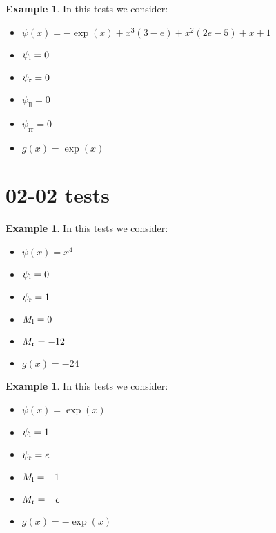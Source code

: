\documentclass[11pt,a4paper]{article}
\theoremstyle{plain}
\theoremstyle{definition}
\newtheorem{exmp}[thm]{Example} %
\begin{document}
\begin{exmp}
\label{Example:PRO:bending:01_01_glob2}
In this tests we consider:
\begin{itemize}
\item $\psi(x)=-\exp(x)+x^3(3-e)+x^2(2e-5)+x+1$
\item $\psi_\text l=0$
\item $\psi_\text r=0$
\item $\psi_\text{ll}=0$
\item $\psi_\text{rr}=0$
\item $g(x)=\exp(x)$
\end{itemize}
\end{exmp}

%
%
%
%

\pagebreak

\section{02-02 tests}

\begin{exmp}
\label{Example:PRO:bending:02_02_glob3}
In this tests we consider:
\begin{itemize}
\item $\psi(x)=x^4$
\item $\psi_\text l=0$
\item $\psi_\text r=1$
\item $M_\text l=0$
\item $M_\text r=-12$
\item $g(x)=-24$
\end{itemize}
\end{exmp}

%
%
%
%
\pagebreak

\begin{exmp}
\label{Example:PRO:bending:02_02_glob6}
In this tests we consider:
\begin{itemize}
\item $\psi(x)=\exp(x)$
\item $\psi_\text l=1$
\item $\psi_\text r=e$
\item $M_\text l=-1$
\item $M_\text r=-e$
\item $g(x)=-\exp(x)$
\end{itemize}
\end{exmp}

\pagebreak
%
%
%
%
\end{document}
